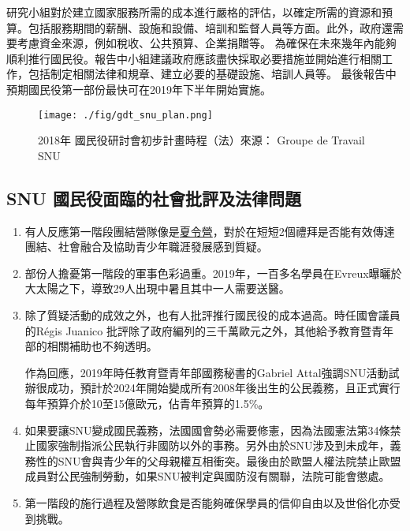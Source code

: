 \documentclass[a4paper,14pt]{extarticle}
\theoremstyle{plain}
\theoremstyle{remark}
\numberwithin{equation}{section}
\begin{document}
研究小組對於建立國家服務所需的成本進行嚴格的評估，以確定所需的資源和預算。包括服務期間的薪酬、設施和設備、培訓和監督人員等方面。此外，政府還需要考慮資金來源，例如稅收、公共預算、企業捐贈等。
為確保在未來幾年內能夠順利推行國民役。報告中小組建議政府應該盡快採取必要措施並開始進行相關工作，包括制定相關法律和規章、建立必要的基礎設施、培訓人員等。
最後報告中預期國民役第一部份最快可在2019年下半年開始實施。



\begin{figure}[H]
	\centering
	\texttt{[image: ./fig/gdt\_snu\_plan.png]}
  \caption{2018年 國民役研討會初步計畫時程（法）來源： Groupe de Travail SNU \cite{gdt_snu_2018}}
  \label{fig:snu_plan}
\end{figure}

\subsection{SNU 國民役面臨的社會批評及法律問題}\label{subsection:snu_debat}

\begin{enumerate}
	\item 有人反應第一階段團結營隊像是\underline{夏令營}，對於在短短2個禮拜是否能有效傳達團結、社會融合及協助青少年職涯發展感到質疑。%
	\item 部份人擔憂第一階段的軍事色彩過重。2019年，一百多名學員在Evreux曝曬於大太陽之下，導致29人出現中暑且其中一人需要送醫。
	\item 除了質疑活動的成效之外，也有人批評推行國民役的成本過高。時任國會議員的Régis Juanico 批評除了政府編列的三千萬歐元之外，其他給予教育暨青年部的相關補助也不夠透明。

    作為回應，2019年時任教育暨青年部國務秘書的Gabriel Attal強調SNU活動試辦很成功，預計於2024年開始變成所有2008年後出生的公民義務，且正式實行每年預算介於10至15億歐元，佔青年預算的1.5\%。\cite{budget_attal}
	\item 如果要讓SNU變成國民義務，法國國會勢必需要修憲，因為法國憲法第34條禁止國家強制指派公民執行非國防以外的事務。另外由於SNU涉及到未成年，義務性的SNU會與青少年的父母親權互相衝突。最後由於歐盟人權法院禁止歐盟成員對公民強制勞動，如果SNU被判定與國防沒有關聯，法院可能會懲處。
	\item 第一階段的施行過程及營隊飲食是否能夠確保學員的信仰自由以及世俗化亦受到挑戰。
\end{enumerate}
\end{document}
